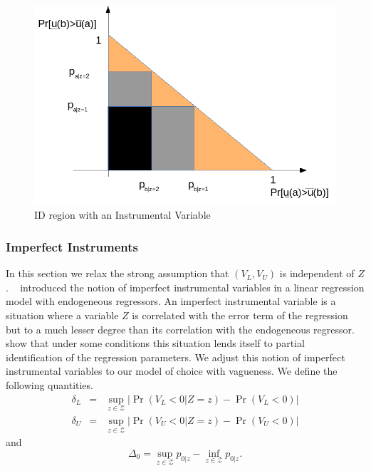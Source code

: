 \documentclass[reqno]{article}
\renewcommand{\cite}{\citet}
\begin{document}
\begin{figure}[h!]
    \centering
    \includegraphics[scale=0.6]{idregion3.png}
    \caption{ID region with an Instrumental Variable}
    \label{fig:IDinstrumental}
\end{figure}

\subsubsection{Imperfect Instruments}

In this section we relax the strong assumption that $\left(
V_{L},V_{U}\right) $ is independent of $Z$. \ \cite{NevoRosen} introduced
the notion of imperfect instrumental variables in a linear regression model
with endogeneous regressors. An imperfect instrumental variable is a
situation where a variable $Z$ is correlated with the error term of the
regression but to a much lesser degree than its correlation with the
endogeneous regressor. \cite{NevoRosen} show that under some conditions this
situation lends itself to partial identification of the regression
parameters. We adjust this notion of imperfect instrumental variables to our
model of choice with vagueness. We define the following quantities.%
\begin{eqnarray*}
\delta _{L} &=&\sup_{z\in \mathcal{Z}}\left\vert \Pr \left(
V_{L}<0|Z=z\right) -\Pr \left( V_{L}<0\right) \right\vert \\
\delta _{U} &=&\sup_{z\in \mathcal{Z}}\left\vert \Pr \left(
V_{U}<0|Z=z\right) -\Pr \left( V_{U}<0\right) \right\vert
\end{eqnarray*}%
and%
\begin{equation*}
\Delta _{0}=\sup_{z\in \mathcal{Z}}p_{0|z}-\inf_{z\in \mathcal{Z}}p_{0|z}.
\end{equation*}
\end{document}
